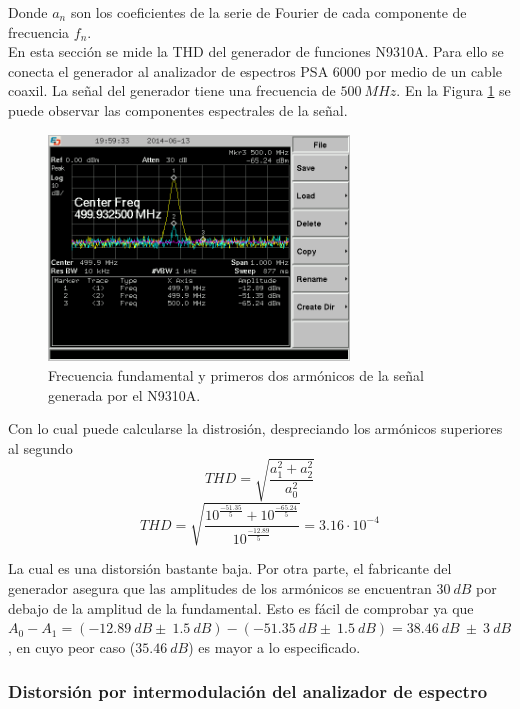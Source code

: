 \documentclass[a4paper,10pt]{article}
\begin{document}
		\indent Donde $a_n$ son los coeficientes de la serie de Fourier de cada 
		componente de frecuencia $f_n$. \\
		\indent En esta secci\'on se mide la THD del generador de funciones 
		N9310A. Para ello se conecta el generador al analizador de espectros PSA
		6000 por medio de un cable coaxil. La se\~nal del generador tiene una 
		frecuencia de $500~MHz$. En la Figura \ref{THD} se puede observar las 
		componentes espectrales de la se\~nal.
		
		\begin{figure}[!htb]
				\centering
				\includegraphics[width=8cm]
				{Imagenes/SCREN445.png}
				\caption{Frecuencia fundamental y primeros dos arm\'onicos de la
				se\~nal generada por el N9310A.}
				\label{THD} 
		\end{figure}
		
		\indent Con lo cual puede calcularse la distrosi\'on, despreciando los 
		arm\'onicos superiores al segundo
		$$THD=\sqrt{\frac{a^2_1+a^2_2}{a^2_0}}$$
		$$THD=\sqrt{\frac{10^{\frac{-51.35}{5}}+10^{\frac{-65.24}{5}}}{10^{
		\frac{-12.89}{5}}}}=3.16\cdot10^{-4}$$
		
		
		\indent La cual es una distorsi\'on bastante baja. Por otra parte, el 
		fabricante del generador asegura que las amplitudes de los arm\'onicos 
		se encuentran $30~dB$ por debajo de la amplitud de la fundamental. Esto 
		es f\'acil de comprobar ya que 
		$A_0-A_1=(-12.89~dB\pm~1.5~dB)-(-51.35~dB\pm~1.5~dB)=38.46~dB~\pm~3~dB$,
		en cuyo peor caso ($35.46~dB$) es mayor a lo especificado.
		
		\subsubsection{Distorsi\'on por intermodulaci\'on del analizador de 
		espectro}
		
\end{document}
